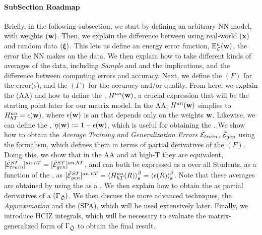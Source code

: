 \paragraph{SubSection Roadmap}
Briefly, in the following subsection,
we start by defining an arbitrary NN model, with weights $({\mathbf{w}})$.
Then, we explain the difference between using real-world $({\mathbf{x}})$ and random data $(\boldsymbol{\xi})$.
This lets us define an energy error function, ${\mathrm{E}}^{n}_{\mathcal{L}}(\mathbf{w})$,
the error the NN makes on the data.
We then explain how to take different kinds of \emph{\Thermodynamic} averages of the data,
including \emph{Sample} and \emph{\ThermalAverages} and the implications,
and the difference between computing errors and accuracy.
Next, we define the \emph{\FreeEnergy} $(F)$ for the error(s), and the \emph{\GeneratingFunction}  $(\Gamma)$
for the accuracy and/or quality.
From here, we explain the \emph{\AnnealedApproximation} (AA) and
how to define the  \emph{\AnnealedHamiltonian}, $H^{an}({\mathbf{w}})$, a crucial expression
that will be the starting point later for our matrix model.
In the AA, $H^{an}({\mathbf{w}})$ simplies to  $H^{an}_{hT}=\epsilon({\mathbf{w}})$, where $\epsilon({\mathbf{w}})$ is an \EffectivePotential
that depends only on the weights ${\mathbf{w}}$.
Likewise, we can define the \SelfOverlap, $\eta({\mathbf{w}}):=1-\epsilon({\mathbf{w}})$, which is useful for
obtaining the \Quality.
We show how to obtain the \emph{Average Training and Generalization Errors} $\bar{\mathcal{E}}_{train}$, $\bar{\mathcal{E}}_{gen}$
using the \STATMECH formalism, which defines them in terms of partial derivatives of the \FreeEnergy $(F)$.
Doing this, we show that in the AA and at high-T they are equivalent,
$[\bar{\mathcal{E}}^{ST}_{train}]^{an,hT}=[\bar{\mathcal{E}}^{ST}_{gen}]^{an,hT}$,
and can both be expressed as a \ThermalAverage over all Students, as a function 
of the \Teacher, as $[\bar{\mathcal{E}}^{ST}_{gen}]^{an,hT}=\left\langle H^{an}_{hT}(R) \right\rangle_{\mathbf s}^{\beta}=\left\langle \epsilon(R) \right\rangle_{\mathbf s}^{\beta}$.
Note that these averages are obtained by using the \FreeEnergy as a \GeneratingFunction.
We then explain how to obtain the \ModelQuality as partial derivatives of a
\emph{\GeneratingFunction} $(\Gamma_{\bar{\mathcal{Q}}})$.
We then discuss the more advanced techniques, the
\emph{\LargeN Approximation} and the \emph{\SaddlePointApproximation} (SPA),
which will be used extensively later.
Finally, we introduce  HCIZ integrals, which will be necessary to evaluate the matrix-generalized
form of $\Gamma_{\bar{\mathcal{Q}}}$ to obtain the final result.


